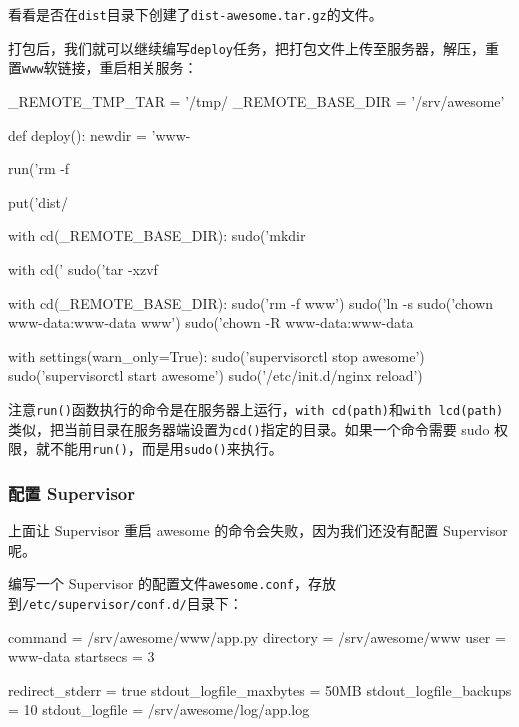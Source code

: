 看看是否在\texttt{dist}目录下创建了\texttt{dist-awesome.tar.gz}的文件。

打包后，我们就可以继续编写\texttt{deploy}任务，把打包文件上传至服务器，解压，重置\texttt{www}软链接，重启相关服务：

\begin{pythoncode}
_REMOTE_TMP_TAR = '/tmp/%
_REMOTE_BASE_DIR = '/srv/awesome'

def deploy():
    newdir = 'www-%
    
    run('rm -f %
    
    put('dist/%
    
    with cd(_REMOTE_BASE_DIR):
        sudo('mkdir %
    
    with cd('%
        sudo('tar -xzvf %
    
    with cd(_REMOTE_BASE_DIR):
        sudo('rm -f www')
        sudo('ln -s %
        sudo('chown www-data:www-data www')
        sudo('chown -R www-data:www-data %
    
    with settings(warn_only=True):
        sudo('supervisorctl stop awesome')
        sudo('supervisorctl start awesome')
        sudo('/etc/init.d/nginx reload')
\end{pythoncode}

注意\texttt{run()}函数执行的命令是在服务器上运行，\texttt{with\ cd(path)}和\texttt{with\ lcd(path)}类似，把当前目录在服务器端设置为\texttt{cd()}指定的目录。如果一个命令需要
sudo 权限，就不能用\texttt{run()}，而是用\texttt{sudo()}来执行。

\hypertarget{ux914dux7f6e-supervisor}{%
\subsubsection{配置 Supervisor}\label{ux914dux7f6e-supervisor}}

上面让 Supervisor 重启 awesome 的命令会失败，因为我们还没有配置
Supervisor 呢。

编写一个 Supervisor
的配置文件\texttt{awesome.conf}，存放到\texttt{/etc/supervisor/conf.d/}目录下：

\begin{pythoncode}

command     = /srv/awesome/www/app.py
directory   = /srv/awesome/www
user        = www-data
startsecs   = 3

redirect_stderr         = true
stdout_logfile_maxbytes = 50MB
stdout_logfile_backups  = 10
stdout_logfile          = /srv/awesome/log/app.log
\end{pythoncode}

